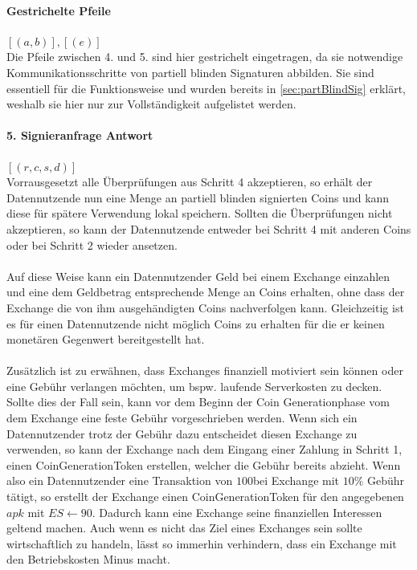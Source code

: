 \documentclass[11pt,a4paper]{scrreprt}
\begin{document}
\paragraph*{Gestrichelte Pfeile} $[(a,b)], [(e)]$\\
Die Pfeile zwischen 4. und 5. sind hier gestrichelt eingetragen, da sie notwendige Kommunikationsschritte von partiell blinden Signaturen abbilden. Sie sind essentiell für die Funktionsweise und wurden bereits in \ref{sec:partBlindSig} erklärt, weshalb sie hier nur zur Vollständigkeit aufgelistet werden.

\paragraph{5. Signieranfrage Antwort} $[(r,c,s,d)]$ \\
Vorrausgesetzt alle Überprüfungen aus Schritt 4 akzeptieren, so erhält der Datennutzende nun eine Menge an partiell blinden signierten Coins und kann diese für spätere Verwendung lokal speichern. Sollten die Überprüfungen nicht akzeptieren, so kann der Datennutzende entweder bei Schritt 4 mit anderen Coins oder bei Schritt 2 wieder ansetzen.\\\\

Auf diese Weise kann ein Datennutzender Geld bei einem Exchange einzahlen und eine dem Geldbetrag entsprechende Menge an Coins erhalten, ohne dass der Exchange die von ihm ausgehändigten Coins nachverfolgen kann. Gleichzeitig ist es für einen Datennutzende nicht möglich Coins zu erhalten für die er keinen monetären Gegenwert bereitgestellt hat.\\\\

Zusätzlich ist zu erwähnen, dass Exchanges finanziell motiviert sein können oder eine Gebühr verlangen möchten, um bspw. laufende Serverkosten zu decken. Sollte dies der Fall sein, kann vor dem Beginn der Coin Generationphase vom dem Exchange eine feste Gebühr vorgeschrieben werden. Wenn sich ein Datennutzender trotz der Gebühr dazu entscheidet diesen Exchange zu verwenden, so kann der Exchange nach dem Eingang einer Zahlung in Schritt 1, einen CoinGenerationToken erstellen, welcher die Gebühr bereits abzieht. Wenn also ein Datennutzender eine Transaktion von $100$\texteuro  bei Exchange mit $10\%$ Gebühr tätigt, so erstellt der Exchange einen CoinGenerationToken für den angegebenen $apk$ mit $ES \leftarrow 90$\texteuro. Dadurch kann eine Exchange seine finanziellen Interessen geltend machen. Auch wenn es nicht das Ziel eines Exchanges sein sollte wirtschaftlich zu handeln, lässt so immerhin verhindern, dass ein Exchange mit den Betriebskosten Minus macht.
\end{document}
